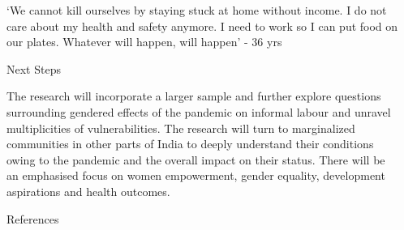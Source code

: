 \documentclass[final]{beamer}
\newlength{\sepwidth}
\newlength{\colwidth}
\newcommand{\separatorcolumn}{\begin{column}{\sepwidth}\end{column}}
\begin{document}
\begin{frame}[t]
\begin{columns}[t]
\begin{column}{\colwidth}
{  \begin{alertblock}{}

‘We cannot kill ourselves by
staying stuck at home without
income. I do not care about my
health and safety anymore. I
need to work so I can put food
on our plates. Whatever will
happen, will happen’ - 36 yrs
  \end{alertblock}
 }

  \begin{block}{Next Steps}

The research will incorporate a
larger sample and further
explore questions surrounding
gendered effects of the
pandemic on informal labour
and unravel multiplicities of
vulnerabilities. The research will
turn to marginalized
communities in other parts of
India to deeply understand their
conditions owing to the
pandemic and the overall
impact on their status. There
will be an emphasised focus on
women empowerment, gender
equality, development
aspirations and health
outcomes.
  \end{block}

  \begin{block}{References}

    \nocite{*}
    \footnotesize{}

  \end{block}

\end{column}
\separatorcolumn

\end{columns}
\end{frame}
\end{document}
